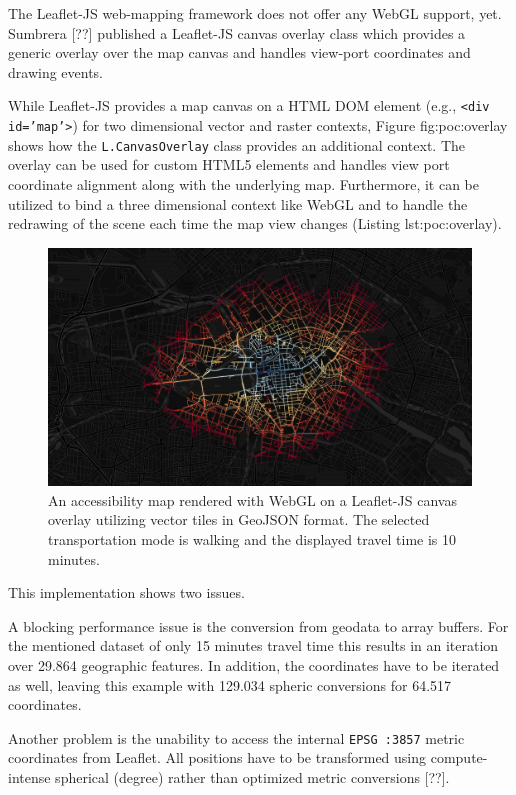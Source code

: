       The Leaflet-JS web-mapping framework does not offer any WebGL support, yet. Sumbrera [??] published a Leaflet-JS canvas overlay class which provides a generic overlay over the map canvas and handles view-port coordinates and drawing events.\par
      
      While Leaflet-JS provides a map canvas on a HTML DOM element (e.g., \texttt{<div id='map'>}) for two dimensional vector and raster contexts, Figure {fig:poc:overlay} shows how the \texttt{L.CanvasOverlay} class provides an additional context. The overlay can be used for custom HTML5 elements and handles view port coordinate alignment along with the underlying map. Furthermore, it can be utilized to bind a three dimensional context like WebGL and to handle the redrawing of the scene each time the map view changes (Listing {lst:poc:overlay}).\par
      \begin{figure}[htb]
        \centering
        \includegraphics[width=0.7\linewidth]{./img/screenshot-poc2-600s-vector.png}
        \caption{An accessibility map rendered with WebGL on a Leaflet-JS canvas overlay utilizing vector tiles in GeoJSON format. The selected transportation mode is walking and the displayed travel time is 10 minutes.}
        \label{fig:poc:two}
      \end{figure}
      This implementation shows two issues.\par
      A blocking performance issue is the conversion from geodata to array buffers. For the mentioned dataset of only 15 minutes travel time this results in an iteration over 29.864 geographic features. In addition, the coordinates have to be iterated as well, leaving this example with 129.034 spheric conversions for 64.517 coordinates.\par
      Another problem is the unability to access the internal \texttt{EPSG :3857} metric coordinates from Leaflet. All positions have to be transformed using compute-intense spherical (degree) rather than optimized metric conversions [??].\par

